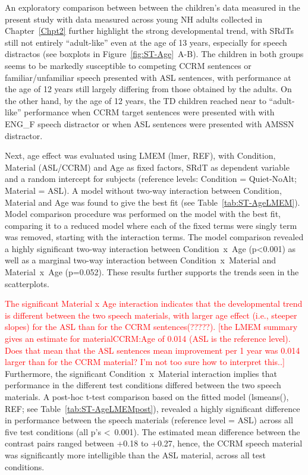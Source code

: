 \documentclass[a4paper, twoside]{templates/ociamthesis}
\begin{document}
An exploratory comparison between between the children's data measured in the present study with data measured across young NH adults collected in Chapter~\ref{Chpt2} further highlight the strong developmental trend, with SRdTs still not entirely ``adult-like'' even at the age of 13 years, especially for speech distractos (see boxplots in Figure~\ref{fig:ST-Age}~A-B). The children in both groups seems to be markedly susceptible to competing CCRM sentences or familiar/unfamiliar speech presented with ASL sentences, with performance at the age of 12 years still largely differing from those obtained by the adults. On the other hand, by the age of 12 years, the TD children reached near to ``adult-like'' performance when CCRM target sentences were presented with with ENG\_F speech distractor or when ASL sentences were presented with AMSSN distractor.

Next, age effect was evaluated using LMEM (lmer, REF), with Condition, Material (ASL/CCRM) and Age as fixed factors, SRdT as dependent variable and a random intercept for subjects (reference levels: Condition = Quiet-NoAlt; Material = ASL). A model without two-way interaction between Condition, Material and Age was found to give the best fit (see Table~\ref{tab:ST-AgeLMEM}). Model comparison procedure was performed on the model with the best fit, comparing it to a reduced model where each of the fixed terms were singly term was removed, starting with the interaction terms. The model comparison revealed a highly significant two-way interaction between Condition~x~Age (p\textless0.001) as well as a marginal two-way interaction between Condition~x~Material and Material~x~Age (p=0.052). These results further supports the trends seen in the scatterplots.

\textcolor{red}{The significant Material x Age interaction indicates that the developmental trend is different between the two speech materials, with larger age effect (i.e., steeper slopes) for the ASL than for the CCRM sentences(?????). [the LMEM summary gives an estimate for materialCCRM:Age of 0.014 (ASL is the reference level). Does that mean that the ASL sentences mean improvement per 1 year was 0.014 larger than for the CCRM material? I'm not too sure how to interpret this..]} Furthermore, the significant Condition~x~Material interaction implies that performance in the different test conditions differed between the two speech materials. A post-hoc t-test comparison based on the fitted model (lsmeans(), REF; see Table~\ref{tab:ST-AgeLMEMpost}), revealed a highly significant difference in performance between the speech materials (reference level = ASL) across all five test conditions (all p's \textless~0.001). The estimated mean difference between the contrast pairs ranged between +0.18 to +0.27, hence, the CCRM speech material was significantly more intelligible than the ASL material, across all test conditions.
\end{document}
